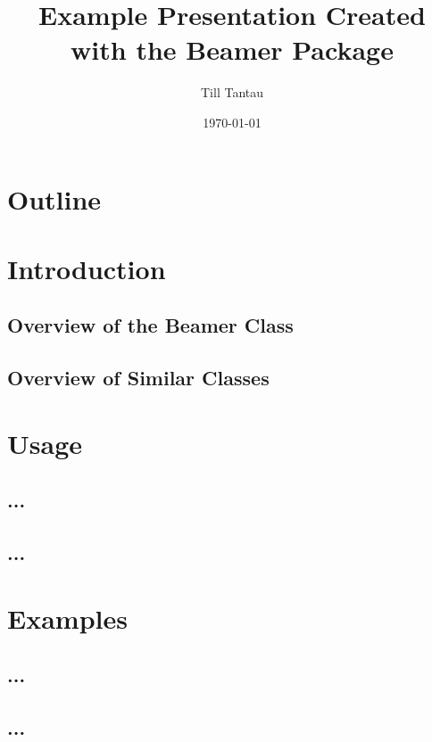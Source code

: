 \documentclass{beamer}
\title{Example Presentation Created with the Beamer Package}
\author{Till Tantau}
\date{\today}
\begin{document}
\begin{frame}
    \titlepage
\end{frame}

\section*{Outline}

\begin{frame}
\tableofcontents
\end{frame}

\section{Introduction}
\subsection{Overview of the Beamer Class}
\subsection{Overview of Similar Classes}

\section{Usage}
\subsection{...}
\subsection{...}

\section{Examples}
\subsection{...}
\subsection{...}

\begin{frame}
\end{frame} %
\end{document}
